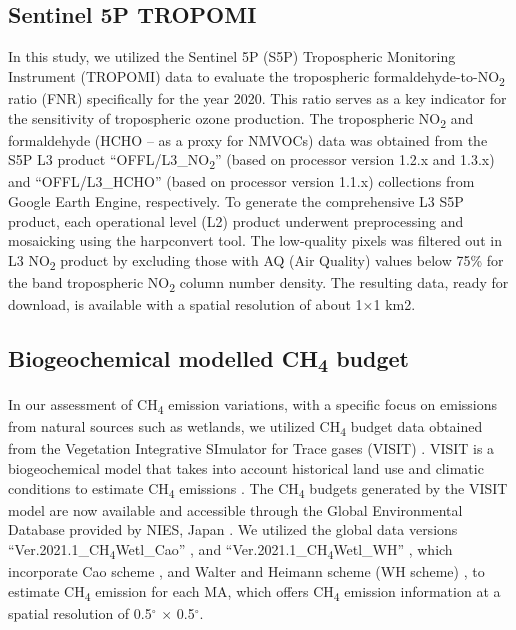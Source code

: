 \subsection{Sentinel 5P TROPOMI}
In this study, we utilized the Sentinel 5P (S5P) Tropospheric Monitoring Instrument (TROPOMI) data to evaluate the tropospheric formaldehyde-to-NO\textsubscript{2} ratio (FNR) specifically for the year 2020. This ratio serves as a key indicator for the sensitivity of tropospheric ozone production. The tropospheric NO\textsubscript{2} and formaldehyde (HCHO – as a proxy for NMVOCs) data was obtained from the S5P L3 product \enquote{OFFL\slash L3\_NO\textsubscript{2}} (based on processor version 1.2.x and 1.3.x) and \enquote{OFFL\slash L3\_HCHO} (based on processor version 1.1.x) collections from Google Earth Engine, respectively. To generate the comprehensive L3 S5P product, each operational level (L2) product underwent preprocessing and mosaicking using the harpconvert tool. The low-quality pixels was filtered out in L3 NO\textsubscript{2} product by excluding those with AQ (Air Quality) values below 75\% for the band tropospheric NO\textsubscript{2} column number density. The resulting data, ready for download, is available with a spatial resolution of about 1$\times$1 km2.
\subsection{Biogeochemical modelled CH\textsubscript{4} budget}
In our assessment of CH\textsubscript{4} emission variations, with a specific focus on emissions from natural sources such as wetlands, we utilized CH\textsubscript{4} budget data obtained from the Vegetation Integrative SImulator for Trace gases (VISIT) \citep{ito2019methane}. VISIT is a biogeochemical model that takes into account historical land use and climatic conditions to estimate CH\textsubscript{4} emissions \citep{ito2019methane}. The CH\textsubscript{4} budgets generated by the VISIT model are now available and accessible through the Global Environmental Database provided by NIES, Japan \citep{ito2019methane}. We utilized the global data versions \enquote{Ver.2021.1\_CH\textsubscript{4}Wetl\_Cao} \citep{ito2021cao}, and \enquote{Ver.2021.1\_CH\textsubscript{4}Wetl\_WH} \citep{ito2021wh}, which incorporate Cao scheme \citep{cao1996global}, and Walter and Heimann scheme (WH scheme) \citep{walter2000process}, to estimate CH\textsubscript{4} emission for each MA, which offers CH\textsubscript{4} emission information at a spatial resolution of 0.5$^{\circ}$ $\times$ 0.5$^{\circ}$. \par
